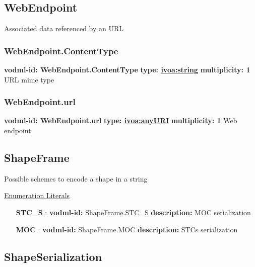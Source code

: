   \subsection{WebEndpoint}
  \label{sect:WebEndpoint}
    Associated data referenced by an URL

    \subsubsection{WebEndpoint.ContentType}
      \textbf{vodml-id: WebEndpoint.ContentType} \newline
      \textbf{type: \hyperref[sect:ivoa]{ivoa:string}} \newline
      \textbf{multiplicity: 1} \newline 
      URL mime type

    \subsubsection{WebEndpoint.url}
      \textbf{vodml-id: WebEndpoint.url} \newline
      \textbf{type: \hyperref[sect:ivoa]{ivoa:anyURI}} \newline
      \textbf{multiplicity: 1} \newline 
      Web endpoint

  \subsection{ShapeFrame}
  \label{sect:ShapeFrame}

  Possible schemes to encode a shape in a string

  \noindent \underline{Enumeration Literals}
  \vspace{-\parsep}
  \small
  \begin{itemize}
  
    \item[\textbf{STC\_S}]: \textbf{vodml-id:} ShapeFrame.STC\_S \newline
          \textbf{description:} MOC serialization
    \item[\textbf{MOC}]: \textbf{vodml-id:} ShapeFrame.MOC \newline
          \textbf{description:} STCs serialization
  \end{itemize}
  \normalsize


  \subsection{ShapeSerialization}
  \label{sect:ShapeSerialization}

